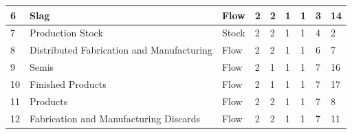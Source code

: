 \documentclass[ %
                    author={Tom Jager},
                supervisor={Dr. Daniel Schien},
                    degree={MEng},
                     title={A Bayesian Inference Engine for Calibrating Uncertainty over UMIS Structured MFA Systems},
                  subtitle={},
                      type={research},
                      year={2019} ]{dissertation}
\begin{document}
\begin{table}[]
\begin{tabular}{|p{1.1cm}|p{2cm}|p{1.5cm}|p{1.5cm}|p{1.5cm}|p{1.5cm}|p{1.5cm}|p{1.6cm}|p{1.5cm}|}
6                       & Slag                                      & Flow                                   & 2                                           & 2                                                & 1                                   & 1                                                & 3                                  & 14                                      \\ \hline
7                       & Production Stock                          & Stock                                  & 2                                           & 2                                                & 1                                   & 1                                                & 4                                  & 2                                       \\ \hline
8                       & Distributed Fabrication and Manufacturing & Flow                                   & 2                                           & 2                                                & 1                                   & 1                                                & 6                                  & 7                                       \\ \hline
9                       & Semis                                     & Flow                                   & 2                                           & 1                                                & 1                                   & 1                                                & 7                                  & 16                                      \\ \hline
10                      & Finished Products                         & Flow                                   & 2                                           & 1                                                & 1                                   & 1                                                & 7                                  & 17                                      \\ \hline
11                      & Products                                  & Flow                                   & 2                                           & 2                                                & 1                                   & 1                                                & 7                                  & 8                                       \\ \hline
12                      & Fabrication and Manufacturing Discards    & Flow                                   & 2                                           & 2                                                & 1                                   & 1                                                & 7                                  & 11                                      \\ \hline

\end{tabular}
\end{table}
\end{document}
